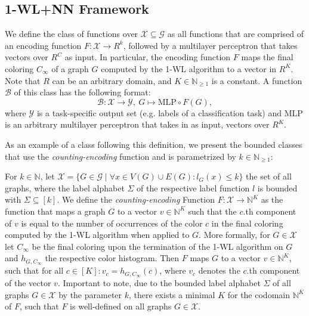 \documentclass[11pt, dvipsnames, DIV=12]{scrreprt}
\theoremstyle{definition}
\newcommand{\Nb}{\mathbb{N}}
\newcommand{\wlnn}{\text{1-WL+NN }}
\begin{document}
\subsection{1-WL+NN Framework}\label{sec:1-WL+NN Definition}
We define the class \wlnn of functions over $\mathcal{X} \subseteq \mathcal{G}$ as all functions that are comprised of an encoding function $F: \mathcal{X} \rightarrow R^k$, followed by a multilayer perceptron that takes vectors over $R^C$ as input. In particular, the encoding function $F$ maps the final coloring $C_\infty$ of a graph $G$ computed by the 1-WL algorithm to a vector in $R^K$. Note that $R$ can be an arbitrary domain, and $K \in \Nb_{\geq 1}$ is a constant. A function $\mathcal{B}$ of this class has the following format:
\begin{equation*}
    \mathcal{B}: \mathcal{X} \rightarrow \mathcal{Y}, \ G \mapsto \text{MLP} \circ F(G),
\end{equation*}
where $\mathcal{Y}$ is a task-specific output set (e.g. labels of a classification task) and MLP is an arbitrary multilayer perceptron that takes in as input, vectors over $R^K$. 


As an example of a class following this definition, we present the bounded \wlnn classes that use the \emph{counting-encoding} function and is parametrized by $k \in \Nb_{\geq 1}$:

For $k \in \mathbb{N}$, let $\mathcal{X} = \{ G \in \mathcal{G} \mid \forall x \in V(G) \cup E(G): l_G(x) \leq k \}$ the set of all graphs, where the label alphabet $\Sigma$ of the respective label function $l$ is bounded with $\Sigma \subseteq [k]$. We define the \emph{counting-encoding} Function $F: \mathcal{X} \rightarrow \mathbb{N}^K$ as the function that maps a graph $G$ to a vector $v \in \mathbb{N}^K$ such that the $c$.th component of $v$ is equal to the number of occurrences of the color $c$ in the final coloring computed by the 1-WL algorithm when applied to $G$. More formally, for $G \in \mathcal{X}$ let $C_\infty$ be the final coloring upon the termination of the 1-WL algorithm on $G$ and $h_{G, C_\infty}$ the respective color histogram. Then $F$ maps $G$ to a vector $v \in \mathbb{N}^K$, such that for all $c \in [K]: v_c = h_{G, C_\infty}(c)$, where $v_c$ denotes the $c$.th component of the vector $v$. Important to note, due to the bounded label alphabet $\Sigma$ of all graphs $G 
\in \mathcal{X}$ by the parameter $k$, there exists a minimal $K$ for the codomain $\Nb^K$ of $F$, such that $F$ is well-defined on all graphs $G \in \mathcal{X}$.
\end{document}
